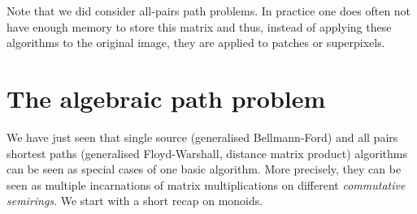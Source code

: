 Note that we did consider all-pairs path problems. In practice one
does often not have enough memory to store this matrix and thus,
instead of applying these algorithms to the original image, they are
applied to patches or superpixels.

\section{The algebraic path problem}
We have just seen that single source (generalised Bellmann-Ford) and
all pairs shortest paths (generalised Floyd-Warshall, distance matrix
product) algorithms can be seen as special cases of one basic
algorithm. More precisely, they can be seen as multiple incarnations
of matrix multiplications on different \emph{commutative semirings}.
We start with a short recap on monoids.

